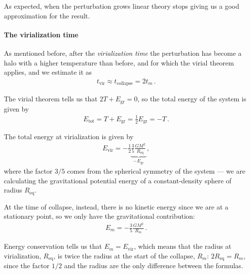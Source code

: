 \documentclass[main.tex]{subfiles}
\begin{document}
As expected, when the perturbation grows linear theory stops giving us a good approximation for the result. 

\paragraph{The virialization time}

As mentioned before, after the \emph{virialization time} the perturbation has become a halo with a higher temperature than before, and for which the virial theorem applies, and we estimate it as
%
\begin{align}
t _{\text{vir}} \approx t_{\text{collapse}} = 2 t_m
\,.
\end{align}

The virial theorem tells us that \(2 T + E _{\text{gr}} = 0\), so the total energy of the system is given by
%
\begin{align}
E _{\text{tot}} = T + E _{\text{gr}} = \frac{1}{2} E _{\text{gr}} = - T  
\,.
\end{align}

The total energy at virialization is given by 
%
\begin{align}
E _{\text{vir}} = - \frac{1}{2} \underbrace{\frac{3}{5} \frac{GM^2}{R _{\text{eq}}}}_{-E _{\text{gr}}}
\,,
\end{align}
%
where the factor \(3/5\) comes from the spherical symmetry of the system --- we are calculating the gravitational potential energy of a constant-density sphere of radius \(R _{\text{eq}}\).

At the time of collapse, instead, there is no kinetic energy since we are at a stationary point, so we only have the gravitational contribution: 
%
\begin{align}
E_m =- \frac{3}{5} \frac{GM^2}{R_m}
\,.
\end{align}

Energy conservation tells us that \(E_m = E _{\text{vir}}\), which means that the radius at virialization, \(R _{\text{eq}}\), is twice the radius at the start of the collapse, \(R_m\): \(2 R _{\text{eq}} = R_{m}\), since the factor \(1/2\) and the radius are the only difference between the formulas. 
\end{document}
